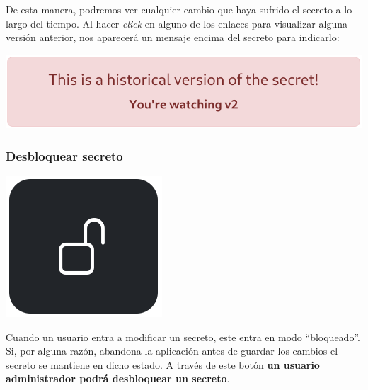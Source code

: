 \documentclass{\ClassPath/viu-tfm-template}
\begin{document}
De esta manera, podremos ver cualquier cambio que haya sufrido el secreto a lo largo del tiempo. Al hacer \textit{click} en alguno de los enlaces para visualizar alguna versión anterior, nos aparecerá un mensaje encima del secreto para indicarlo:

\begin{center}
    \includegraphics[width=0.6\linewidth]{img/history2.png}
\end{center}

\subsubsection*{Desbloquear secreto}
{
\begin{minipage}{0.1\linewidth}
    \includegraphics[width=\linewidth]{img/unlock.png}
\end{minipage}
\hspace{0.5cm}
\begin{minipage}{0.9\linewidth}
    Cuando un usuario entra a modificar un secreto, este entra en modo “bloqueado”. Si, por alguna razón, abandona la aplicación antes de guardar los cambios el secreto se mantiene en dicho estado. A través de este botón \textbf{un usuario administrador podrá desbloquear un secreto}.
\end{minipage}
}
\end{document}
